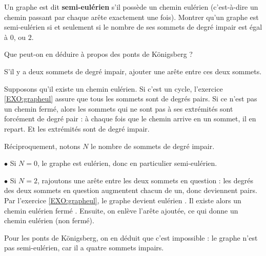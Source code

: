\begin{exo}
 Un graphe est dit \textbf{semi-eulérien} s'il possède un chemin eulérien (c'est-à-dire un chemin passant par chaque arête exactement une fois). Montrer qu'un graphe est semi-eulérien si et seulement si le nombre de ses sommets de degré impair est égal à $0$, ou $2$. 

Que peut-on en déduire à propos des ponts de Königsberg ?
\begin{hint}
S'il y a deux sommets de degré impair, ajouter une arête entre ces deux sommets.
\end{hint}
\begin{sol}
Supposons qu'il existe un chemin eulérien. Si c'est un cycle, l'exercice \ref{EXO:grapheul} assure que 
tous les sommets sont de degrés pairs. Si ce n'est pas un chemin fermé, alors les sommets qui ne sont pas à ses extrémités sont forcément de degré pair : à chaque fois que le chemin arrive en un sommet, il en repart. Et les extrémités sont de degré impair.

Réciproquement, notons $N$ le nombre de sommets de degré impair.

$\bullet$ Si $N=0$, le graphe est eulérien, donc en particulier semi-eulérien.

$\bullet$ Si $N=2$, rajoutons une arête entre les deux sommets en question : les degrés des deux sommets en question augmentent chacun de  un, donc deviennent pairs. Par l'exercice \ref{EXO:grapheul}, le graphe devient eulérien . Il existe alors un chemin eulérien fermé . Ensuite, on enlève l'arête ajoutée, ce qui donne un chemin eulérien (non fermé).

Pour les ponts de Königsberg, on en déduit que c'est impossible : le graphe n'est pas semi-eulérien, car il a quatre sommets impairs.

%
%
\end{sol}
\end{exo}




